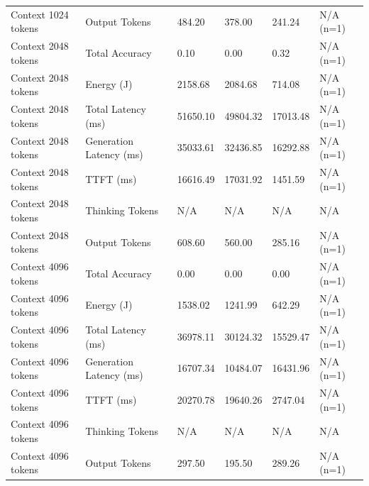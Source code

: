 \begin{table}
\begin{tabular}{llllll}
Context 1024 tokens & Output Tokens & 484.20 & 378.00 & 241.24 & N/A (n=1) \\
Context 2048 tokens & Total Accuracy & 0.10 & 0.00 & 0.32 & N/A (n=1) \\
Context 2048 tokens & Energy (J) & 2158.68 & 2084.68 & 714.08 & N/A (n=1) \\
Context 2048 tokens & Total Latency (ms) & 51650.10 & 49804.32 & 17013.48 & N/A (n=1) \\
Context 2048 tokens & Generation Latency (ms) & 35033.61 & 32436.85 & 16292.88 & N/A (n=1) \\
Context 2048 tokens & TTFT (ms) & 16616.49 & 17031.92 & 1451.59 & N/A (n=1) \\
Context 2048 tokens & Thinking Tokens & N/A & N/A & N/A & N/A \\
Context 2048 tokens & Output Tokens & 608.60 & 560.00 & 285.16 & N/A (n=1) \\
Context 4096 tokens & Total Accuracy & 0.00 & 0.00 & 0.00 & N/A (n=1) \\
Context 4096 tokens & Energy (J) & 1538.02 & 1241.99 & 642.29 & N/A (n=1) \\
Context 4096 tokens & Total Latency (ms) & 36978.11 & 30124.32 & 15529.47 & N/A (n=1) \\
Context 4096 tokens & Generation Latency (ms) & 16707.34 & 10484.07 & 16431.96 & N/A (n=1) \\
Context 4096 tokens & TTFT (ms) & 20270.78 & 19640.26 & 2747.04 & N/A (n=1) \\
Context 4096 tokens & Thinking Tokens & N/A & N/A & N/A & N/A \\
Context 4096 tokens & Output Tokens & 297.50 & 195.50 & 289.26 & N/A (n=1) \\
\bottomrule
\end{tabular}
\end{table}
